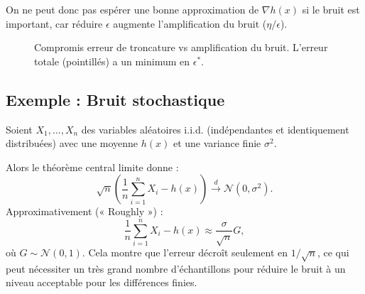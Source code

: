 On ne peut donc pas espérer une bonne approximation de $\nabla h(x)$ si le bruit est important, car réduire $\epsilon$ augmente l'amplification du bruit ($\eta/\epsilon$).

\begin{figure}[H]
\centering
{}
\caption{Compromis erreur de troncature vs amplification du bruit. L'erreur totale (pointillés) a un minimum en $\epsilon^*$.}
\label{fig:error-epsilon}
\end{figure}

\subsection{Exemple : Bruit stochastique}

Soient $X_1, \dots, X_n$ des variables aléatoires i.i.d. (indépendantes et identiquement distribuées) avec une moyenne $h(x)$ et une variance finie $\sigma^2$.

Alors le théorème central limite donne :
\[
    \sqrt{n} \left( \frac{1}{n} \sum_{i=1}^n X_i - h(x) \right) \xrightarrow{d} \mathcal{N}(0, \sigma^2).
\]
Approximativement (« Roughly ») :
\[
    \frac{1}{n} \sum_{i=1}^n X_i - h(x) \approx \frac{\sigma}{\sqrt{n}} G,
\]
où $G \sim \mathcal{N}(0, 1)$.
Cela montre que l'erreur décroît seulement en $1/\sqrt{n}$, ce qui peut nécessiter un très grand nombre d'échantillons pour réduire le bruit à un niveau acceptable pour les différences finies.

